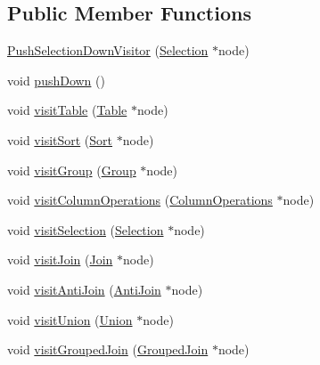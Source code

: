 \subsection*{Public Member Functions}
\begin{DoxyCompactItemize}
\item 
\hyperlink{classrafe_1_1_push_selection_down_visitor_a2854b5c8406e3839eb3fe55f3a519418}{Push\+Selection\+Down\+Visitor} (\hyperlink{classrafe_1_1_selection}{Selection} $\ast$node)
\item 
void \hyperlink{classrafe_1_1_push_selection_down_visitor_a5d8909a5f4757aec278c185f41b3e11c}{push\+Down} ()
\item 
void \hyperlink{classrafe_1_1_push_selection_down_visitor_a22d4efbe167182bb5815c3155e4dfb15}{visit\+Table} (\hyperlink{classrafe_1_1_table}{Table} $\ast$node)
\item 
void \hyperlink{classrafe_1_1_push_selection_down_visitor_a4ea8d60b4150cbd0e7f95bd24f551433}{visit\+Sort} (\hyperlink{classrafe_1_1_sort}{Sort} $\ast$node)
\item 
void \hyperlink{classrafe_1_1_push_selection_down_visitor_adc69a8ddf6a81cdfb1ab4ea8b2cdaf6e}{visit\+Group} (\hyperlink{classrafe_1_1_group}{Group} $\ast$node)
\item 
void \hyperlink{classrafe_1_1_push_selection_down_visitor_a4e6aa36753bc28600ea0bebfb4e501fb}{visit\+Column\+Operations} (\hyperlink{classrafe_1_1_column_operations}{Column\+Operations} $\ast$node)
\item 
void \hyperlink{classrafe_1_1_push_selection_down_visitor_a437c6c29c1d52149650c7b1443915d58}{visit\+Selection} (\hyperlink{classrafe_1_1_selection}{Selection} $\ast$node)
\item 
void \hyperlink{classrafe_1_1_push_selection_down_visitor_a97825d74e8407111b3c28b4cd5b139dc}{visit\+Join} (\hyperlink{classrafe_1_1_join}{Join} $\ast$node)
\item 
void \hyperlink{classrafe_1_1_push_selection_down_visitor_ab291a0f8f4e2c3638562b2ab628f9ed9}{visit\+Anti\+Join} (\hyperlink{classrafe_1_1_anti_join}{Anti\+Join} $\ast$node)
\item 
void \hyperlink{classrafe_1_1_push_selection_down_visitor_aa46479b019c02a80571e1b676d1f0aea}{visit\+Union} (\hyperlink{classrafe_1_1_union}{Union} $\ast$node)
\item 
void \hyperlink{classrafe_1_1_push_selection_down_visitor_ab3b99f6ca0ffc272be2a328b3bc13e31}{visit\+Grouped\+Join} (\hyperlink{classrafe_1_1_grouped_join}{Grouped\+Join} $\ast$node)
\end{DoxyCompactItemize}

